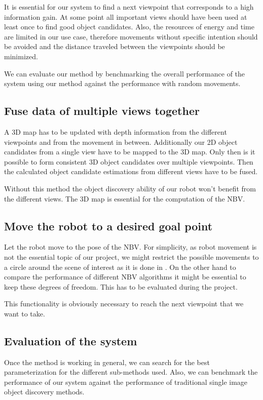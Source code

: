 \documentclass[a4paper,11pt,english]{article}
\begin{document}
It is essential for our system to find a next viewpoint that corresponds to a high information gain.
At some point all important views should have been used at least once to find good object candidates.
Also, the resources of energy and time are limited in our use case, therefore movements without specific intention should be avoided and the distance traveled between the viewpoints should be minimized.

We can evaluate our method by benchmarking the overall performance of the system using our method against the performance with random movements.

\subsection{Fuse data of multiple views together}
A 3D map has to be updated with depth information from the different viewpoints and from the movement in between.
Additionally our 2D object candidates from a single view have to be mapped to the 3D map.
Only then is it possible to form consistent 3D object candidates over multiple viewpoints.
Then the calculated object candidate estimations from different views have to be fused.

Without this method the object discovery ability of our robot won't benefit from the different views.
The 3D map is essential for the computation of the NBV.

\subsection{Move the robot to a desired goal point}
Let the robot move to the pose of the NBV.
For simplicity, as robot movement is not the essential topic of our project, we might restrict the possible movements to a circle around the scene of interest as it is done in \cite{atanasov2014nonmyopic}. On the other hand to compare the performance of different NBV algorithms it might be essential to keep these degrees of freedom. This has to be evaluated during the project.

This functionality is obviously necessary to reach the next viewpoint that we want to take.

\subsection{Evaluation of the system}
Once the method is working in general, we can search for the best parameterization for the different sub-methods used.
Also, we can benchmark the performance of our system against the performance of traditional single image object discovery methods.
\end{document}
